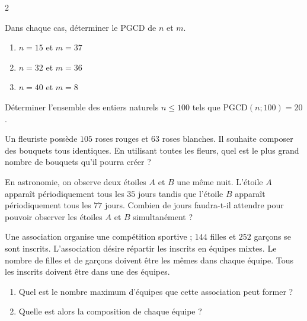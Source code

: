 \documentclass[a4paper,12pt]{article}
\title{
\centering
\tcbset{colframe=BlackSav,colback=GrayBG}
\tcbox[tikznode]{
Chapitre 5 \\Dérivation et applications
}
}
\author{}
\date{}
\begin{document}
\maketitle

\begin{multicols}{2}
\begin{exercice}[title=Exercice 1 $\quad \star \quad$ { [Calculer] }]{}{}
Dans chaque cas, déterminer le PGCD de $n$ et $m$.
\begin{enumerate}
    \item $n = 15$ et $m = 37$
    \item $n = 32$ et $m = 36$
    \item $n = 40$ et $m = 8$
\end{enumerate}
\end{exercice}

\begin{exercice}[title=Exercice 2 $\quad \star \quad$ { [Calculer] }]{}{}
Déterminer l’ensemble des entiers naturels $n \leq 100$ tels que $\text{PGCD}(n; 100) = 20$.
\end{exercice}

\begin{exercice}[title=Exercice 3 $\quad \star \quad$ { [Modéliser, Calculer] }]{}{}
Un fleuriste possède $105$ roses rouges et $63$ roses blanches. Il souhaite composer des bouquets tous identiques.  
En utilisant toutes les fleurs, quel est le plus grand nombre de bouquets qu’il pourra créer ?
\end{exercice}

\begin{exercice}[title=Exercice 4 $\quad \star \quad$ { [Modéliser, Calculer] }]{}{}
En astronomie, on observe deux étoiles $A$ et $B$ une même nuit. L’étoile $A$ apparaît périodiquement tous les $35$ jours tandis que l’étoile $B$ apparaît périodiquement tous les $77$ jours.  
Combien de jours faudra-t-il attendre pour pouvoir observer les étoiles $A$ et $B$ simultanément ?
\end{exercice}

\begin{exercice}[title=Exercice 5 $\quad \star \quad$ { [Modéliser, Calculer] }]{}{}
Une association organise une compétition sportive ; $144$ filles et $252$ garçons se sont inscrits. L’association désire répartir les inscrits en équipes mixtes. Le nombre de filles et de garçons doivent être les mêmes dans chaque équipe. Tous les inscrits doivent être dans une des équipes.  
\begin{enumerate}
    \item Quel est le nombre maximum d’équipes que cette association peut former ?
    \item Quelle est alors la composition de chaque équipe ?
\end{enumerate}
\end{exercice}


\end{multicols}
\end{document}
